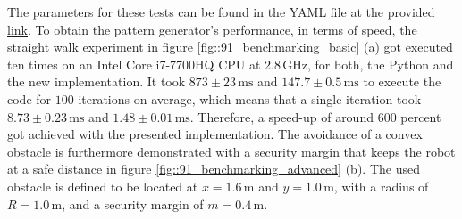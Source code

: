 The parameters for these tests can be found in the YAML file at the provided \href{https://github.com/mhubii/nmpc_pattern_generator/blob/719fde0bb73925923de85cbf379c5523e075dfeb/libs/pattern_generator/configs_hrp2.yaml#L1}{\underline{link}}. To obtain the pattern generator's performance, in terms of speed, the straight walk experiment in figure \ref{fig::91_benchmarking_basic} (a) got executed ten times on an Intel Core i7-7700HQ CPU at $2.8\,\text{GHz}$, for both, the Python and the new implementation. It took $873\pm23\,\text{ms}$ and $147.7\pm0.5\,\text{ms}$ to execute the code for $100$ iterations on average, which means that a single iteration took $8.73\pm0.23\,\text{ms}$ and $1.48\pm0.01\,\text{ms}$. Therefore, a speed-up of around $600$ percent got achieved with the presented implementation. The avoidance of a convex obstacle is furthermore demonstrated with a security margin that keeps the robot at a safe distance in figure \ref{fig::91_benchmarking_advanced} (b). The used obstacle is defined to be located at $x=1.6\,\text{m}$ and $y=1.0\,\text{m}$, with a radius of $R=1.0\,\text{m}$, and a security margin of $m=0.4\,\text{m}$.
